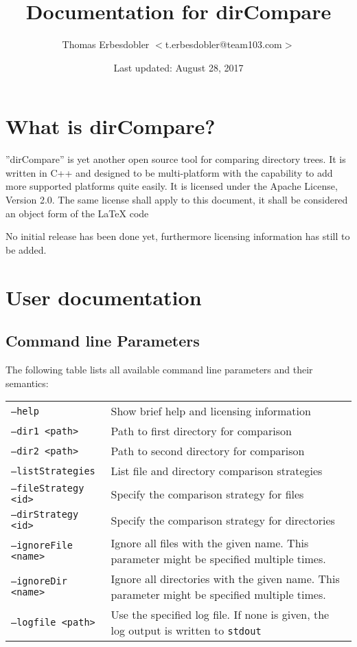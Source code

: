 \documentclass[a4paper]{article}
\title{Documentation for dirCompare}
\author{Thomas Erbesdobler $<$t.erbesdobler@team103.com$>$}
\date{Last updated: August 28, 2017}
\begin{document}
	\maketitle
	\tableofcontents
	
	\section{What is dirCompare?}
	\label{sec:what_is_dircompare}
	
	''dirCompare'' is yet another open source tool for comparing directory trees. It is written in C++ and designed to be multi-platform with the capability to add more supported platforms quite easily. It is licensed under the Apache License, Version 2.0. The same license shall apply to this document, it shall be considered an object form of the \LaTeX{} code
	
	No initial release has been done yet, furthermore licensing information has still to be added.
	
	\section{User documentation}
	\label{sec:user_documentation}
	
	\subsection{Command line Parameters}
	\label{subsec:command_line_parameters}
	
	The following table lists all available command line parameters and their semantics:
	
	\begin{tabularx}{\linewidth}{l|X}
		\texttt{--help} & Show brief help and licensing information \\
		\texttt{--dir1 \textless path\textgreater} & Path to first directory for comparison \\
		\texttt{--dir2 \textless path\textgreater} & Path to second directory for comparison \\
		\texttt{--listStrategies} & List file and directory comparison strategies \\
		\texttt{--fileStrategy \textless id\textgreater} & Specify the comparison strategy for files \\
		\texttt{--dirStrategy \textless id\textgreater} & Specify the comparison strategy for directories \\
		\texttt{--ignoreFile \textless name\textgreater} & Ignore all files with the given name. This parameter might be specified multiple times. \\
		\texttt{--ignoreDir \textless name\textgreater} & Ignore all directories with the given name. This parameter might be specified multiple times. \\
		\texttt{--logfile \textless path\textgreater} & Use the specified log file. If none is given, the log output is written to \texttt{stdout} \\
	\end{tabularx}
	
\end{document}
